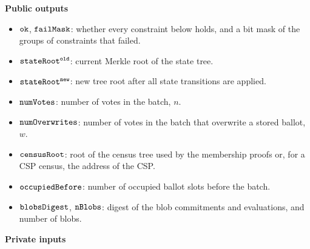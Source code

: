 	\vspace{0.3cm}
	\noi \textbf{Public outputs}
	\begin{itemize}
		\item \public $\texttt{ok}$, $\texttt{failMask}$: whether every constraint below holds, and a bit mask of the groups of constraints that failed.
		\item \public $\texttt{stateRoot}^\texttt{old}$: current Merkle root of the state tree.
		\item \public $\texttt{stateRoot}^\texttt{new}$: new tree root after all state transitions are applied.
		\item \public $\texttt{numVotes}$: number of votes in the batch, $n$.
		\item \public $\texttt{numOverwrites}$: number of votes in the batch that overwrite a stored ballot, $w$.
		\item \public $\texttt{censusRoot}$: root of the census tree used by the membership proofs or, for a \ac{CSP} census, the address of the \ac{CSP}.
		\item \public $\texttt{occupiedBefore}$: number of occupied ballot slots before the batch.
		\item \public $\texttt{blobsDigest}$, $\texttt{nBlobs}$: digest of the blob commitments and evaluations, and number of blobs.
	\end{itemize}
	\textbf{Private inputs}

